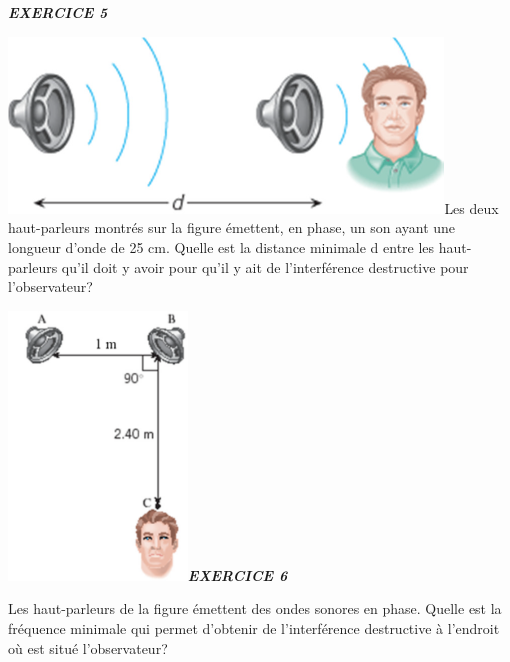 {\emph{\textbf{EXERCICE 5}}

\includegraphics[width=11.546cm,height=4.688cm]{Pictures/1000000100000363000001603D3E7105AB252F90.png}Les
deux haut-parleurs montrés sur la figure émettent, en phase, un son
ayant une longueur d'onde de 25 cm. Quelle est la distance minimale d
entre les haut-parleurs qu'il doit y avoir pour qu'il y ait de
l'interférence destructive pour l'observateur?

\includegraphics[width=4.757cm,height=7.147cm]{Pictures/10000001000001BA00000298E2F6E319C348E061.png}\emph{\textbf{EXERCICE
6}}

Les haut-parleurs de la figure émettent des ondes sonores en phase.
Quelle est la fréquence minimale qui permet d'obtenir de l'interférence
destructive à l'endroit où est situé l'observateur?

}
